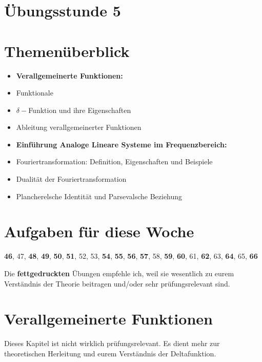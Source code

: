 \documentclass[11pt]{article}
\begin{document}
\thispagestyle{firstpage}

\setlength{\headheight}{1 \baselineskip}  %
\setlength{\parindent}{0pt}  %
\setlength{\parskip}{\baselineskip}  %

\vspace*{-5px}
\section*{Übungsstunde 5}

\section*{Themenüberblick}
\begin{itemize}
    \item \textbf{Verallgemeinerte Funktionen:}
    \item[] Funktionale
    \item[] $\delta-$Funktion und ihre Eigenschaften
    \item[] Ableitung verallgemeinerter Funktionen
    \item \textbf{Einführung Analoge Lineare Systeme im Frequenzbereich:}
    \item[] Fouriertransformation: Definition, Eigenschaften und Beispiele
    \item[] Dualität der Fouriertransformation
    \item[] Plancherelsche Identität und Parsevalsche Beziehung
\end{itemize}

\section*{Aufgaben für diese Woche}
\vspace{-0.5cm}

\textbf{46}, 47, \textbf{48}, \textbf{49}, \textbf{50}, \textbf{51}, 52, 53, \textbf{54}, \textbf{55}, \textbf{56}, \textbf{57}, 58, \textbf{59}, \textbf{60}, 61, \textbf{62}, 63, \textbf{64}, 65, \textbf{66}\\
\vspace{-0.5cm}

Die \textbf{fettgedruckten} Übungen empfehle ich, weil sie wesentlich zu eurem Verständnis der Theorie beitragen und/oder sehr prüfungsrelevant sind.

\vfill \null
\pagebreak

\section*{Verallgemeinerte Funktionen}
\vspace*{-0.5cm}
Dieses Kapitel ist nicht wirklich prüfungsrelevant. Es dient mehr zur theoretischen Herleitung und eurem Verständnis der Deltafunktion.
\vspace*{-0.5cm}
\end{document}
